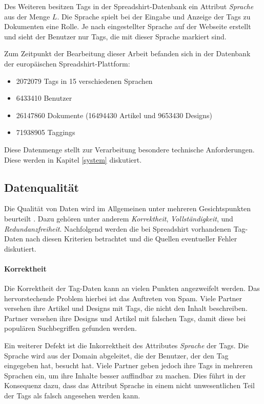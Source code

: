 Des Weiteren besitzen Tags in der Spreadshirt-Datenbank ein Attribut \emph{Sprache} aus der Menge \(L\). Die Sprache spielt bei der Eingabe und Anzeige der Tags zu Dokumenten eine Rolle. Je nach eingestellter Sprache auf der Webseite erstellt und sieht der Benutzer nur Tags, die mit dieser Sprache markiert sind.

Zum Zeitpunkt der Bearbeitung dieser Arbeit befanden sich in der Datenbank der europäischen Spreadshirt-Plattform:

\begin{itemize}
    \item \num{2072079} Tags in \num{15} verschiedenen Sprachen
    \item \num{6433410} Benutzer
    \item \num{26147860} Dokumente (\num{16494430} Artikel und \num{9653430} Designs)
    \item \num{71938905} Taggings
\end{itemize}

Diese Datenmenge stellt zur Verarbeitung besondere technische Anforderungen. Diese werden in Kapitel \ref{system} diskutiert.

\subsection{Datenqualität}
\label{quality}

Die Qualität von Daten wird im Allgemeinen unter mehreren Gesichtspunkten beurteilt \cite{hkp2012}. Dazu gehören unter anderem \emph{Korrektheit}, \emph{Vollständigkeit}, und \emph{Redundanzfreiheit}. Nachfolgend werden die bei Spreadshirt vorhandenen Tag-Daten nach diesen Kriterien betrachtet und die Quellen eventueller Fehler \cite[43 ff]{jo2003} diskutiert.

\paragraph{Korrektheit}

Die Korrektheit der Tag-Daten kann an vielen Punkten angezweifelt werden. Das hervorstechende Problem hierbei ist das Auftreten von Spam. Viele Partner versehen ihre Artikel und Designs mit Tags, die nicht den Inhalt beschreiben. Partner versehen ihre Designs und Artikel mit falschen Tags, damit diese bei populären Suchbegriffen gefunden werden.

Ein weiterer Defekt ist die Inkorrektheit des Attributes \emph{Sprache} der Tags. Die Sprache wird aus der Domain abgeleitet, die der Benutzer, der den Tag eingegeben hat, besucht hat. Viele Partner geben jedoch ihre Tags in mehreren Sprachen ein, um ihre Inhalte besser auffindbar zu machen. Dies führt in der Konsequenz dazu, dass das Attribut Sprache in einem nicht unwesentlichen Teil der Tags als falsch angesehen werden kann.

